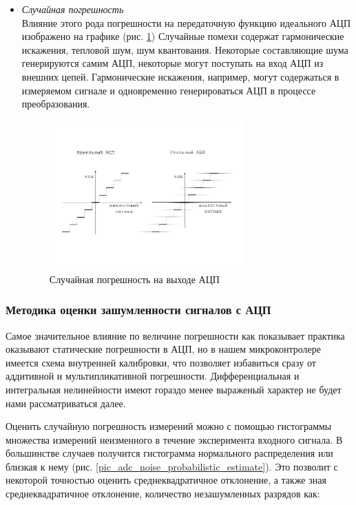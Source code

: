 \begin{itemize}
    \item \textit{Случайная погрешность} \\
        Влияние этого рода погрешности на передаточную функцию идеального АЦП изображено на графике
        (рис. \ref{pic_adc_code_transition_noise})
        Случайные помехи содержат гармонические искажения, тепловой шум, шум квантования.
        Некоторые составляющие шума генерируются самим АЦП, некоторые могут поступать на вход АЦП
        из внешних цепей. Гармонические искажения, например, могут содержаться в измеряемом сигнале
        и одновременно генерироваться АЦП в процессе преобразования.
        \begin{figure}[!ht]
            \centering
            \includegraphics[width=0.7\textwidth, keepaspectratio, clip=true, trim=5mm 35mm 5mm 35mm]
                            {./src/pictures/adc_code_transition_noise}
            \caption{Случайная погрешность на выходе АЦП}
            \label{pic_adc_code_transition_noise}
        \end{figure}
\end{itemize}

\subsubsection{ Методика оценки зашумленности сигналов с АЦП }
Самое значительное влияние по величине погрешности как показывает практика оказывают статические
погрешности в АЦП, но в нашем микроконтролере имеется схема внутренней калибровки, что позволяет
избавиться сразу от аддитивной и мультипликативной погрешности. Дифференциальная и интегральная
нелинейности имеют гораздо менее выраженый характер не будет нами рассматриваться далее.

Оценить случайную погрешность измерений можно с помощью гистограммы множества измерений
неизменного в течение эксперимента входного сигнала. В большинстве случаев получится
гистограмма нормального распределения или близкая к нему
(рис. \ref{pic_adc_noise_probabilistic_estimate}). Это позволит с некоторой точностью
оценить среднеквадратичное отклонение, а также зная среднеквадратичное отклонение, количество
незашумленных разрядов как:

